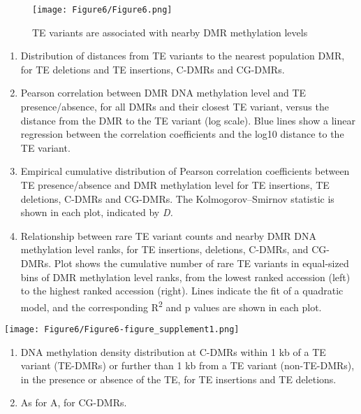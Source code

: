 \documentclass[12pt]{article}
\begin{document}
\pagebreak


\begin{figure}[!ht]
  \centering
  \texttt{[image: Figure6/Figure6.png]}
  \caption{TE variants are associated with nearby DMR methylation levels}
  \label{fig6}
\end{figure}


\begin{enumerate}
  \def\labelenumi{(\Alph{enumi})}
\item
  Distribution of distances from TE variants to the nearest population
  DMR, for TE deletions and TE insertions, C-DMRs and CG-DMRs.
\item
  Pearson correlation between DMR DNA methylation level and TE
  presence/absence, for all DMRs and their closest TE variant, versus
  the distance from the DMR to the TE variant (log scale). Blue lines
  show a linear regression between the correlation coefficients and the
  log10 distance to the TE variant.
\item
  Empirical cumulative distribution of Pearson correlation coefficients
  between TE presence/absence and DMR methylation level for TE
  insertions, TE deletions, C-DMRs and CG-DMRs. The Kolmogorov--Smirnov
  statistic is shown in each plot, indicated by \emph{D.}
\item
  Relationship between rare TE variant counts and nearby DMR DNA
  methylation level ranks, for TE insertions, deletions, C-DMRs, and
  CG-DMRs. Plot shows the cumulative number of rare TE variants in
  equal-sized bins of DMR methylation level ranks, from the lowest
  ranked accession (left) to the highest ranked accession (right). Lines
  indicate the fit of a quadratic model, and the corresponding R\textsuperscript{2} and p
  values are shown in each plot.
\end{enumerate}

\pagebreak


\setcounter{suppfigure}{5}

\begin{suppfigure}
  \centering
  \texttt{[image: Figure6/Figure6-figure\_supplement1.png]}
  \caption{figure supplement 1}
  \label{fig6s1}
\end{suppfigure}

\begin{enumerate}
  \def\labelenumi{(\Alph{enumi})}
\item
  DNA methylation density distribution at C-DMRs within 1 kb of a TE
  variant (TE-DMRs) or further than 1 kb from a TE variant
  (non-TE-DMRs), in the presence or absence of the TE, for TE insertions
  and TE deletions.
\item
  As for A, for CG-DMRs.
\end{enumerate}
\end{document}
